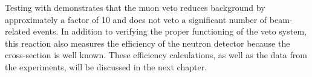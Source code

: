 Testing with \MgReaction demonstrates that the muon veto reduces background by approximately a factor of 10 and does not veto a significant number of beam-related events.  In addition to verifying the proper functioning of the veto system, this reaction also measures the efficiency of the neutron detector because the cross-section is well known.  These efficiency calculations, as well as the data from the \GeTargets experiments, will be discussed in the next chapter.


%
% 
% 
